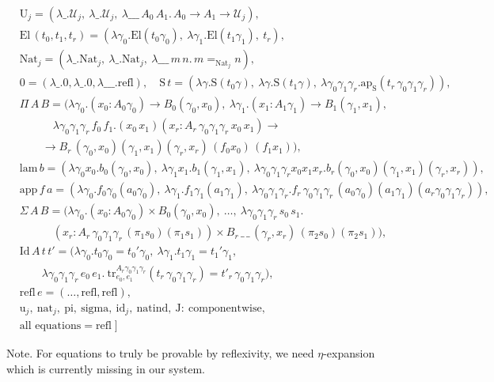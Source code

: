 \[\begin{array}{ll}
&\mathrm U_j=(\lambda\_.\mathcal U_j,\ \lambda\_.\mathcal U_j,\ \lambda\_\_\_\,A_0\,A_1.\,A_0\to A_1\to\mathcal U_j),\\
&\mathrm{El}\,(t_0,t_1,t_r)=(\lambda\gamma_0.\mathrm{El}(t_0\gamma_0),\ \lambda\gamma_1.\mathrm{El}(t_1\gamma_1),\ t_r),\\
&\mathrm{Nat}_j=(\lambda\_.\mathrm{Nat}_j,\ \lambda\_.\mathrm{Nat}_j,\ \lambda\_\_\_\,m\,n.\,m=_{\mathrm{Nat}_j}n),\\
&0=(\lambda\_.0,\lambda\_.0,\lambda\_\_\_.\mathrm{refl}),\quad
\mathrm S\,t=(\lambda\gamma.\mathrm S(t_0\gamma),\ \lambda\gamma.\mathrm S(t_1\gamma),\ \lambda\gamma_0\gamma_1\gamma_r.\mathrm{ap}_{\mathrm S}(t_r\,\gamma_0\gamma_1\gamma_r)),\\
&\Pi\,A\,B=\big(\lambda\gamma_0.(x_0:A_0\gamma_0)\to B_0(\gamma_0,x_0),\ \lambda\gamma_1.(x_1:A_1\gamma_1)\to B_1(\gamma_1,x_1),\\
&\qquad\quad \lambda\gamma_0\gamma_1\gamma_r\,f_0\,f_1.(x_0\,x_1)(x_r:A_r\,\gamma_0\gamma_1\gamma_r\,x_0\,x_1)\to\\&\qquad\to B_r\,(\gamma_0,x_0)(\gamma_1,x_1)(\gamma_r,x_r)\,(f_0x_0)\,(f_1x_1)\big),\\
&\mathrm{lam}\,b=(\lambda\gamma_0x_0.b_0(\gamma_0,x_0),\ \lambda\gamma_1x_1.b_1(\gamma_1,x_1),\ \lambda\gamma_0\gamma_1\gamma_rx_0x_1x_r.b_r(\gamma_0,x_0)(\gamma_1,x_1)(\gamma_r,x_r)),\\
&\mathrm{app}\,f\,a=(\lambda\gamma_0.f_0\gamma_0(a_0\gamma_0),\ \lambda\gamma_1.f_1\gamma_1(a_1\gamma_1),\ \lambda\gamma_0\gamma_1\gamma_r.f_r\,\gamma_0\gamma_1\gamma_r\,(a_0\gamma_0)(a_1\gamma_1)(a_r\gamma_0\gamma_1\gamma_r)),\\
&\Sigma\,A\,B=\big(\lambda\gamma_0.(x_0:A_0\gamma_0)\times B_0(\gamma_0,x_0),\ \dots,\
 \lambda\gamma_0\gamma_1\gamma_r\,s_0\,s_1.\\
 &\qquad\quad(x_r:A_r\,\gamma_0\gamma_1\gamma_r\,(\pi_1s_0)(\pi_1s_1))\times B_r\,\_\,\_\,(\gamma_r,x_r)\,(\pi_2s_0)(\pi_2s_1)\big),\\
&\mathrm{Id}\,A\,t\,t'=\big(\lambda\gamma_0.t_0\gamma_0=t_0'\gamma_0,\ \lambda\gamma_1.t_1\gamma_1=t_1'\gamma_1,\
 \\&\qquad\lambda\gamma_0\gamma_1\gamma_r\,e_0\,e_1.\ \mathrm{tr}^{A_r\gamma_0\gamma_1\gamma_r}_{e_0,e_1}(t_r\,\gamma_0\gamma_1\gamma_r)=t'_r\,\gamma_0\gamma_1\gamma_r\big),\\
&\mathrm{refl}\,e=(\dots,\mathrm{refl},\mathrm{refl}),\\
&\mathrm u_j,\ \mathrm{nat}_j,\ \mathrm{pi},\ \mathrm{sigma},\ \mathrm{id}_j,\ \mathrm{natind},\ \mathrm J:\ \text{componentwise},\\
&\text{all equations}=\mathrm{refl}
\;]
\end{array}
\]

Note. For equations to truly be provable by reflexivity,
we need $\eta$-expansion which is currently missing in
our system.
